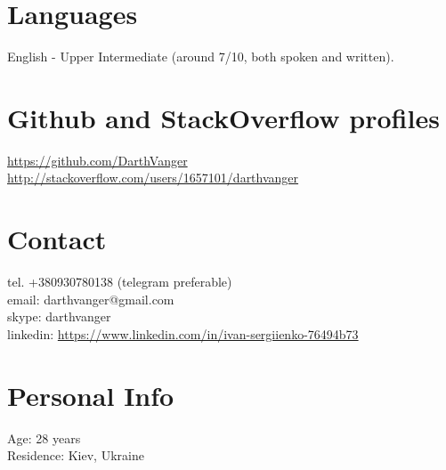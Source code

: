 \documentclass[a4paper, 14pt]{article}
\begin{document}
\section{Languages}
	English - Upper Intermediate (around 7/10, both spoken and written).

\section{Github and StackOverflow profiles}
  \url{https://github.com/DarthVanger} \\
  \url{http://stackoverflow.com/users/1657101/darthvanger}

\section{Contact}
	tel. +380930780138 (telegram preferable) \\
	email: darthvanger@gmail.com \\
  skype: darthvanger \\
  linkedin: \url{https://www.linkedin.com/in/ivan-sergiienko-76494b73} \\
\section{Personal Info}
	Age: 28 years \\
	Residence: Kiev, Ukraine
\end{document}
